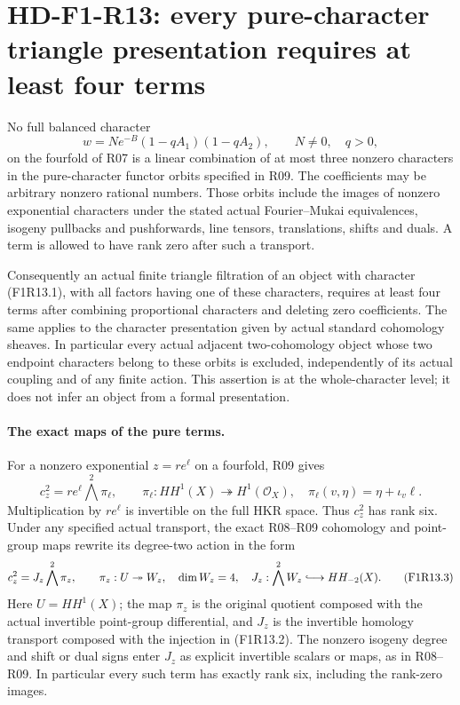 \section{HD-F1-R13: every pure-character triangle presentation requires at least four terms}
\label{sec:followup-rm-three-pure}

No full balanced character
\[
             w=N e^{-B}(1-qA_1)(1-qA_2),
                    \qquad N\ne0,\quad q>0,
 \tag{F1R13.1}
\]
on the fourfold of R07 is a linear combination of at most
three nonzero characters in the pure-character functor
orbits specified in R09. The coefficients may be arbitrary
nonzero rational numbers. Those orbits include the images
of nonzero exponential characters under the stated actual
Fourier--Mukai equivalences, isogeny pullbacks and pushforwards,
line tensors, translations, shifts and duals. A term is
allowed to have rank zero after such a transport.

Consequently an actual finite triangle filtration of an
object with character (F1R13.1), with all factors having
one of these characters, requires at least four terms
after combining proportional characters and deleting zero
coefficients. The same applies to the character presentation
given by actual standard cohomology sheaves. In particular
every actual adjacent two-cohomology object whose two
endpoint characters belong to these orbits is excluded,
independently of its actual coupling and of any finite action.
This assertion is at the whole-character level; it does
not infer an object from a formal presentation.

\paragraph{The exact maps of the pure terms.}
For a nonzero exponential $z=r e^{\ell}$ on a fourfold,
R09 gives
\[
 c_z^2=r e^{\ell}\bigwedge^2\pi_\ell,
 \qquad
 \pi_\ell:HH^1(X)\twoheadrightarrow H^1(\mathcal O_X),
 \quad\pi_\ell(v,\eta)=\eta+\iota_v\ell.
 \tag{F1R13.2}
\]
Multiplication by $r e^{\ell}$ is invertible on the full
HKR space. Thus $c_z^2$ has rank six. Under any specified
actual transport, the exact R08--R09 cohomology and point-group
maps rewrite its degree-two action in the form
\[
 c_z^2=J_z\bigwedge^2\pi_z,
 \qquad \pi_z:U\twoheadrightarrow W_z,
 \quad\dim W_z=4,
 \quad J_z:\bigwedge^2W_z\lhook\joinrel\longrightarrow HH_{-2}(X).
 \tag{F1R13.3}
\]
Here $U=HH^1(X)$; the map $\pi_z$ is the original quotient
composed with the actual invertible point-group differential,
and $J_z$ is the invertible homology transport composed with
the injection in (F1R13.2). The nonzero isogeny degree and
shift or dual signs enter $J_z$ as explicit invertible
scalars or maps, as in R08--R09. In particular every such
term has exactly rank six, including the rank-zero images.

